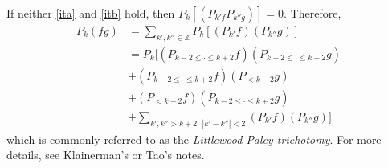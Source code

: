 \documentclass[12pt,reqno]{amsart}
\numberwithin{equation}{section}  %
\newcommand{\zz}{\mathbb{Z}}
\begin{document}
%
If neither \eqref{ita} and \eqref{itb} hold, then $P_{k} [(P_{k' f} P_{k''g})]=0$. Therefore, 
%
%
%
%
\begin{equation*}
\begin{split}
  P_{k}(fg) 
  & = \sum_{k', k'' \in \zz} P_{k}\left[ (P_{k'}f)(P_{k''}g) \right ]
  \\
  & = P_{k} \big [ (P_{k-2 \le \cdot \le k+2}f)(P_{k-2 \le \cdot \le k+2}g) 
  \\
  & + (P_{k-2 \le \cdot \le k+2}f)(P_{< k-2}g) 
  \\
  & + (P_{< k-2}f)(P_{k-2 \le \cdot \le k+2}g) 
  \\
  & + \sum_{k', k'' > k+2 : \ |k' - k''|< 2}(P_{k'}f)(P_{k''}g) \big ]
\end{split}
\end{equation*}
%
%
which is commonly referred to as the \emph{Littlewood-Paley trichotomy}. For more details, see Klainerman's or Tao's notes.
%
%
%
%
%
    
\end{document}
